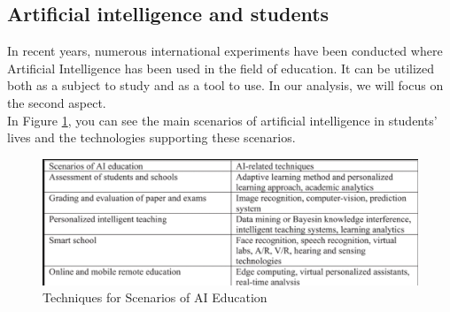 \documentclass[a4paper,12pt]{article}
\begin{document}
\subsection{Artificial intelligence and students}
In recent years, numerous international experiments have been conducted where Artificial Intelligence has been used in the field of education. It can be utilized both as a subject to study and as a tool to use\cite{cesaretti2021intelligenza}. 
In our analysis, we will focus on the second aspect.
\\ \newline
In Figure \ref{fig:enter-label}, you can see the main scenarios of artificial intelligence in students' lives and the technologies supporting these scenarios.
 \begin{figure}
     \includegraphics[scale=0.8]{figure1.png}
     \caption{Techniques for Scenarios of AI Education \cite{ArtificialInInEd}}
     \label{fig:enter-label}
 \end{figure}

\newpage    %

\end{document}
